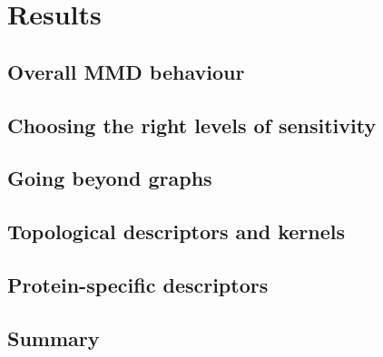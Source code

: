\chapter{Results}

\section{Overall MMD behaviour}

\section{Choosing the right levels of sensitivity}

\section{Going beyond graphs}

\section{Topological descriptors and kernels}

\section{Protein-specific descriptors}










\section{Summary}
